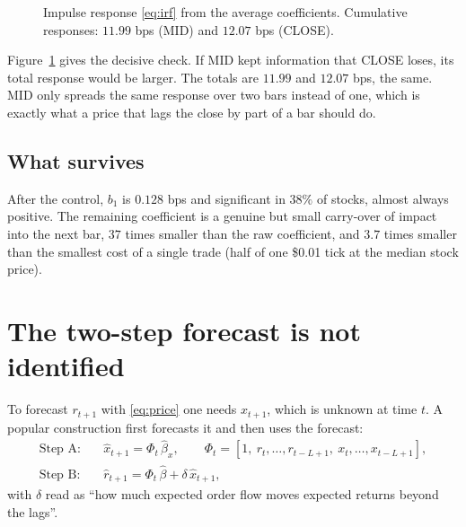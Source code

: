 \documentclass[11pt,a4paper]{article}
\begin{document}
\begin{figure}[htbp]
\centering
{}
\caption{Impulse response \eqref{eq:irf} from the average coefficients. Cumulative responses:
$11.99$ bps (MID) and $12.07$ bps (CLOSE).}
\label{fig:irf}
\end{figure}

Figure~\ref{fig:irf} gives the decisive check. If MID kept information that CLOSE loses, its total response
would be larger. The totals are $11.99$ and $12.07$ bps, the same. MID only spreads the same
response over two bars instead of one, which is exactly what a price that lags the close by part of a
bar should do.

\subsection{What survives}

After the control, $b_1$ is $0.128$ bps and significant in $38\%$ of stocks, almost always positive. The remaining coefficient is a genuine but small carry-over of impact into the next bar, $37$ times smaller
than the raw coefficient, and $3.7$ times smaller than the smallest cost of a single trade
(half of one \$0.01 tick at the median stock price).

\section{The two-step forecast is not identified}
\label{sec:twostep}

To forecast $r_{t+1}$ with \eqref{eq:price} one needs $x_{t+1}$, which is unknown at time $t$. A popular
construction first forecasts it and then uses the forecast:
\begin{align*}
\text{Step A:}\quad & \hat x_{t+1} = \Phi_t\,\hat\beta_x, \qquad \Phi_t=[1,\ r_t,\dots,r_{t-L+1},\ x_t,\dots,x_{t-L+1}],\\
\text{Step B:}\quad & \hat r_{t+1} = \Phi_t\,\hat\beta + \delta\,\hat x_{t+1},
\end{align*}
with $\delta$ read as ``how much expected order flow moves expected returns beyond the lags''.
\end{document}
